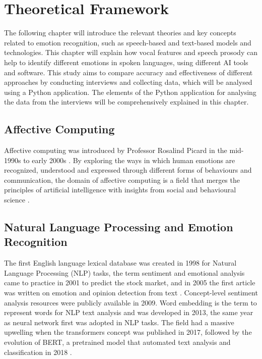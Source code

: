 \chapter{Theoretical Framework}
\label{chap:theoretical-framework}

The following chapter will introduce the relevant theories and key concepts related to emotion recognition, such as speech-based and text-based models and technologies. 
This chapter will explain how vocal features and speech prosody can help to identify different emotions in spoken languages, using different AI tools and software. This study aims to compare accuracy and effectiveness of different approaches by conducting interviews and collecting data, which will be analysed using a Python application. The elements of the Python application for analysing the data from the interviews will be comprehensively explained in this chapter.

\section{Affective Computing}

 Affective computing was introduced by Professor Rosalind Picard in the mid-1990s to early 2000s \autocite{Tian2022}. By exploring the ways in which human emotions are recognized, understood and expressed through different forms of behaviours and communication, the domain of affective computing is a field that merges the principles of artificial intelligence with insights from social and behavioural science \autocite{Tian2022}.

\section{Natural Language Processing and Emotion Recognition}
The first English language lexical database was created in 1998 for Natural Language Processing (NLP) tasks, the term sentiment and emotional analysis came to practice in 2001 to predict the stock market, and in 2005 the first article was written on emotion and opinion detection from text \autocite{Kusal2023}. Concept-level sentiment analysis resources were publicly available in 2009. Word embedding is the term to represent words for NLP text analysis and was developed in 2013, the same year as neural network first was adopted in NLP tasks. The field had a massive upwelling when the transformers concept was published in 2017, followed by the evolution of BERT, a pretrained model that automated text analysis and classification in 2018 \autocite{Kusal2023}. 

